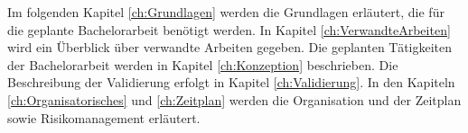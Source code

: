 Im folgenden Kapitel \ref{ch:Grundlagen} werden die Grundlagen erläutert, die für die geplante Bachelorarbeit benötigt werden. In Kapitel \ref{ch:VerwandteArbeiten} wird ein Überblick über verwandte Arbeiten gegeben. Die geplanten Tätigkeiten der Bachelorarbeit werden in Kapitel \ref{ch:Konzeption} beschrieben. Die Beschreibung der Validierung erfolgt in Kapitel \ref{ch:Validierung}. In den Kapiteln \ref{ch:Organisatorisches} und \ref{ch:Zeitplan} werden die Organisation und der Zeitplan sowie Risikomanagement erläutert.
